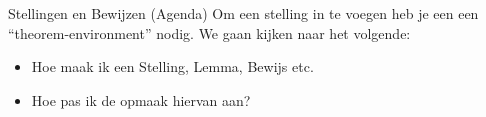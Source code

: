 \begin{frame}[fragile]{Stellingen en Bewijzen (Agenda)}
    Om een stelling in te voegen heb je een een \enquote{theorem-environment} nodig. 
    We gaan kijken naar het volgende:
    \begin{itemize}[label=\textbullet]
        \item Hoe maak ik een Stelling, Lemma, Bewijs etc. 
        \item Hoe pas ik de opmaak hiervan aan?
    \end{itemize}
\end{frame}